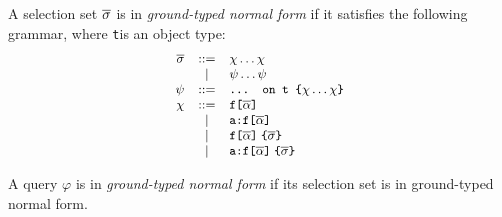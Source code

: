 \begin{definition}
A \gql selection set $\overline{\sigma}$ is in \textit{ground-typed normal form} if it satisfies the following grammar, where \texttt{t}is an object type: %
\begin{displaymath}\small
	\begin{array}{rcl}
	\overline{\sigma} & ::= & \chi \ldots \chi \\
	& | & \psi \ldots \psi\\
	\psi & ::= & \texttt{... on t \{}\chi \ldots \chi\texttt{\}}\\
	\chi & ::= & \texttt{f[}\overline{\alpha}\texttt{]} \\
	& | & \texttt{a:}\texttt{f[}\overline{\alpha}\texttt{]}\\
	& | & \texttt{f[}\overline{\alpha}\texttt{]}\; \texttt{\{}\overline{\sigma}\texttt{\}}\\
	& | & \texttt{a:}\texttt{f[}\overline{\alpha}\texttt{]}\; \texttt{\{}\overline{\sigma}\texttt{\}}	
	\end{array}
\end{displaymath}
	
	\end{definition}
\iffalse
\begin{itemize}
	\item If it is a field then its subselections are either all fields or all inline fragments
	\item If it is an inline fragment, then its type condition is an object type and its subselections are only fields, and
	\item Its subselections are in ground-typed normal form.
\end{itemize}
\end{definition}
\fi

\begin{definition}
A \gql query $\varphi$ is in \textit{ground-typed normal form} if its selection set is in ground-typed normal form.
\end{definition}

\iffalse
We formalize the latter with the following definition in Coq.
\begin{verbatim}
Definition is_a_grounded_typed_nf_query 
  (s : wfGraphQLSchema) (|$\query$| : query) :=
    are_in_ground_typed_nf s |$\query$|.(selection_set).
  \end{verbatim}
  \fi 

